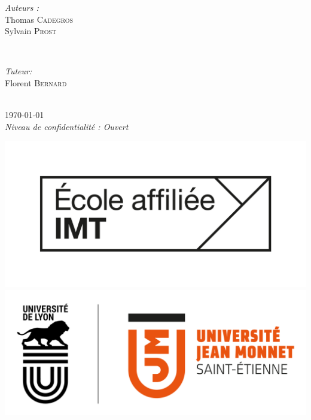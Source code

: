 \begin{titlepage}
\begin{center}
        
        \begin{minipage}{0.3\textwidth}
        \begin{flushleft} \large
        \emph{Auteurs :}\\
        Thomas \textsc{Cadegros}\\
        Sylvain \textsc{Prost}
        \end{flushleft}
        \end{minipage}
        ~
        \begin{minipage}{0.3\textwidth}
        \begin{flushright} \large
        \emph{Tuteur:} \\
        Florent \textsc{Bernard} %
        \end{flushright}
        \end{minipage}\\[2cm]

        \today\\[5pt]
        \textit{Niveau de confidentialité : Ouvert}\\
        \vfill
        \hfill
    
    \end{center}

        \includegraphics[scale=0.07]{images/IMT_Affiliee_logo_Noir.png}
        \includegraphics[scale=0.28]{images/logo_UJM.png}

    
    
\end{titlepage}